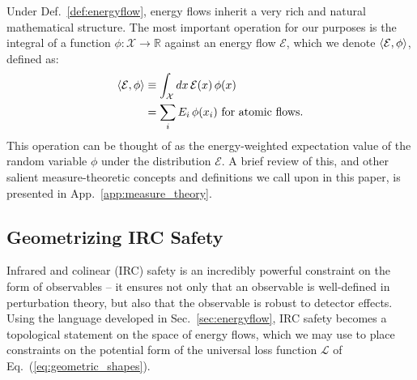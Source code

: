 \documentclass[letterpaper,11pt]{article}
\newcommand{\E}{\mathcal{E}}
\DeclareRobustCommand{\Sec}[1]{Sec.~\ref{sec:#1}}
\DeclareRobustCommand{\App}[1]{App.~\ref{app:#1}}
\DeclareRobustCommand{\Eq}[1]{Eq.~(\ref{eq:#1})}
\DeclareRobustCommand{\Def}[1]{Def.~\ref{def:#1}}
\begin{document}
Under \Def{energyflow}, energy flows inherit a very rich and natural mathematical structure. The most important operation for our purposes is the integral of a function $\phi:\mathcal{X}\to\mathbb{R}$ against an energy flow $\E$, which we denote $\expval{\E, \phi}$, defined as:
%
\begin{align}
    \expval{\E, \phi} &\equiv \int_\mathcal{X}dx\, \E(x) \, \phi(x) \\
    &= \sum_i E_i\, \phi(x_i) \text{ for atomic flows.}
\end{align}
%
This operation can be thought of as the energy-weighted expectation value of the random variable $\phi$ under the distribution $\E$.
%
A brief review of this, and other salient measure-theoretic concepts and definitions we call upon in this paper, is presented in \App{measure_theory}.




\subsection{Geometrizing IRC Safety}\label{sec:irc}

Infrared and colinear (IRC) safety is an incredibly powerful constraint on the form of observables -- it ensures not only that an observable is well-defined in perturbation theory, but also that the observable is robust to detector effects.
%
Using the language developed in \Sec{energyflow}, IRC safety becomes a topological statement on the space of energy flows, which we may use to place constraints on the potential form of the universal loss function $\mathcal{L}$ of \Eq{geometric_shapes}.
\end{document}
